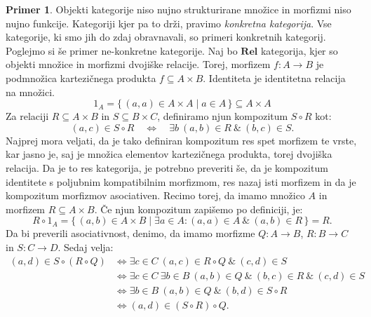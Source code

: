 \documentclass[12pt,a4paper]{book}
\theoremstyle{definition}
\theoremstyle{plain}
\theoremstyle{definition}
\newtheorem{primer}{Primer}[section]
\theoremstyle{remark}
\newcommand{\cat}[1]{\textbf{#1}}
\renewcommand{\set}[1]{\{\,#1\,\}}
\begin{document}
\begin{primer}
Objekti kategorije niso nujno strukturirane množice in morfizmi niso nujno funkcije. Kategoriji kjer pa to drži, pravimo \emph{konkretna kategorija}. Vse kategorije, ki smo jih do zdaj obravnavali, so primeri konkretnih kategorij.
Poglejmo si še primer ne-konkretne kategorije. Naj bo $\cat{Rel}$ kategorija, kjer so objekti množice in morfizmi dvojiške relacije. Torej, morfizem $f : A \to B$ je podmnožica kartezičnega produkta $f \subseteq A \times B$. Identiteta je identitetna relacija na množici.
$$ 1_A = \set{(a,a) \in A \times A \mid a \in A} \subseteq A \times A$$
Za relaciji $R \subseteq A \times B$ in $S \subseteq B \times C$, definiramo njun kompozitum $S \circ R$ kot:
$$(a,c) \in S \circ R \quad \Leftrightarrow \quad \exists b \ (a,b) \in R \ \& \ (b,c) \in S.$$
%
Najprej mora veljati, da je tako definiran kompozitum res spet morfizem te vrste, kar jasno je, saj je množica elementov kartezičnega produkta, torej dvojiška relacija. Da je to res kategorija, je potrebno preveriti še, da je kompozitum identitete s poljubnim kompatibilnim morfizmom, res nazaj isti morfizem in da je kompozitum morfizmov asociativen. Recimo torej, da imamo množico $A$ in morfizem $R \subseteq A \times B$. Če njun kompozitum zapišemo po definiciji, je:
$$R \circ 1_A = \set{(a,b) \in A \times B \mid \exists a \in A : (a,a) \in A \ \& \ (a,b)\in R} = R.$$
Da bi preverili asociativnost, denimo, da imamo morfizme $Q:A \to B$, $R:B \to C$ in $S: C \to D$. Sedaj velja:
\begin{align*}
(a,d) \in S \circ (R \circ Q) &\Leftrightarrow \exists c \in C \ (a,c) \in R \circ Q \ \& \ (c,d) \in S \\
&\Leftrightarrow \exists c \in C \ \exists b \in B \ (a,b) \in Q \ \& \ (b,c) \in R \ \& \ (c,d) \in S \\
&\Leftrightarrow \exists b \in B \ (a,b) \in Q \ \& \ (b,d) \in S \circ R \\
&\Leftrightarrow (a,d) \in (S \circ R) \circ Q.
\end{align*}

\end{primer}
\end{document}
